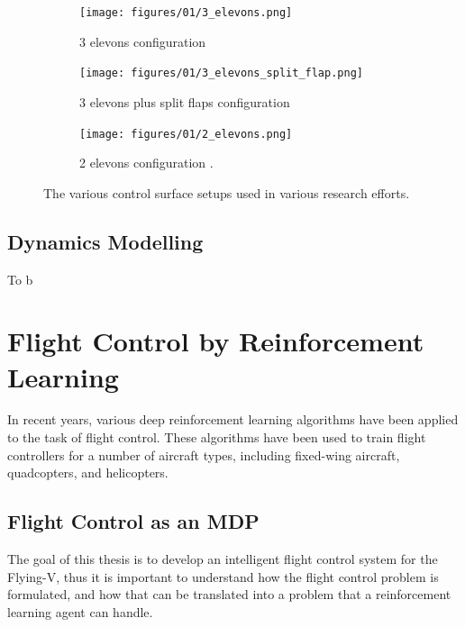 \documentclass[../report.tex]{subfiles}
\begin{document}
\begin{figure}[h]
     \centering
     \begin{subfigure}[b]{0.3\textwidth}
         \centering
         \texttt{[image: figures/01/3\_elevons.png]}
         \caption{3 elevons configuration \cite{palermo2020experimental}}
         \label{subfig:3_elevons}
     \end{subfigure}
     \hfill
     \begin{subfigure}[b]{0.3\textwidth}
         \centering
         \texttt{[image: figures/01/3\_elevons\_split\_flap.png]}
         \caption{3 elevons plus split flaps configuration \cite{split_flap_nolet}}
         \label{subfig:3_elevons_split_flap}
     \end{subfigure}
     \hfill
     \begin{subfigure}[b]{0.3\textwidth}
         \centering
         \texttt{[image: figures/01/2\_elevons.png]}
         \caption{2 elevons configuration \cite{overeem_modelling}.}
         \label{subfig:2_elevons}
     \end{subfigure}
        \caption{The various control surface setups used in various research efforts.}
        \label{fig:3_setups}
\end{figure}
\subsection{Dynamics Modelling}\label{subsec:v_model}

To b

\section{Flight Control by Reinforcement Learning}\label{sec:rl_flight_control}

In recent years, various deep reinforcement learning algorithms have been applied to the task of flight control. These algorithms have been used to train flight controllers for a number of aircraft types, including fixed-wing aircraft, quadcopters, and helicopters. 


\subsection{Flight Control as an MDP}\label{subsec:flight_control_mdp}

The goal of this thesis is to develop an intelligent flight control system for the Flying-V, thus it is important to understand how the flight control problem is formulated, and how that can be translated into a problem that a reinforcement learning agent can handle. 
\end{document}
